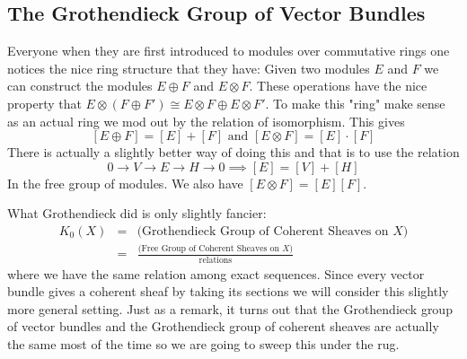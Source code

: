\documentclass[12pt]{article}
\numberwithin{equation}{section}
\theoremstyle{definition}
\newtheorem{exercise}[theorem]{Exercise}
\theoremstyle{remark}
\newtheorem{remark}[theorem]{Remark}
\newcommand{\Ocal}{\mathcal{O}}
\newcommand{\Coh}{\operatorname{Coh}}
\newcommand{\NN}{\mathbb{N}}
\begin{document}
\subsection{The Grothendieck Group of Vector Bundles}
Everyone when they are first introduced to modules over commutative rings one notices the nice ring structure that they have: 
Given two modules $E$ and $F$ we can construct the modules $E \oplus F $ and $E \otimes F$.
These operations have the nice property that $E \otimes( F \oplus F') \cong E \otimes F \oplus E \otimes F'$.
To make this "ring" make sense as an actual ring we mod out by the relation of isomorphism. 
This gives
$$[E \oplus F ] = [E] + [F] \mbox{ and } [E \otimes F] = [E] \cdot [F] $$
There is actually a slightly better way of doing this and that is to use the relation
$$0 \to V \to E \to H \to 0 \implies [E] = [V] + [H] $$
In the free group of modules. 
We also have $[E\otimes F] = [E][F]$.

What Grothendieck did is only slightly fancier:
\begin{eqnarray*}
	K_0(X) &=& \mbox{(Grothendieck Group of Coherent Sheaves on $X$)}\\
	&=& \frac{\mbox{(Free Group of Coherent Sheaves on $X$)} }{\mbox{relations}}
\end{eqnarray*}
where we have the same relation among exact sequences. 
Since every vector bundle gives a coherent sheaf by taking its sections we will consider this slightly more general setting.
Just as a remark, it turns out that the Grothendieck group of vector bundles and the Grothendieck group of coherent sheaves are actually the same most of the time so we are going to sweep this under the rug.

\end{document}
